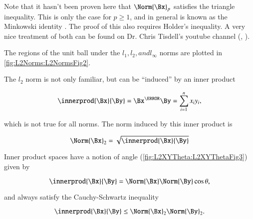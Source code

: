 Note that it hasn't been proven here that \( \Norm{\Bx}_p \) satisfies the triangle inequality.  This is only the case for \( p \ge 1 \), and in general is known as the Minkowski identity \citep{triangleInequalityMathSE}.  The proof of this also requires Holder's inequality.  A very nice treatment of both can be found on Dr. Chris Tisdell's youtube channel (\citep{tisdellMinkowski}, \citep{tisdellHolder}).


The regions of the unit ball under the \( l_1, l_2, and l_\infty \) norms are plotted in \cref{fig:L2Norms:L2NormsFig2}.


The \( l_2 \) norm is not only familiar, but can be ``induced'' by an inner product

\begin{equation}\label{eqn:convex-optimizationLecture2:84}
\innerprod{\Bx}{\By} = \Bx^\T \By = \sum_{i = 1}^n x_i y_i,
\end{equation}

which is not true for all norms.  The norm induced by this inner product is

\begin{dmath}\label{eqn:convex-optimizationLecture2:104}
\Norm{\Bx}_2 = \sqrt{ \innerprod{\Bx}{\By} }
\end{dmath}

Inner product spaces have a notion of angle
(\cref{fig:L2XYTheta:L2XYThetaFig3})
given by

\begin{dmath}\label{eqn:convex-optimizationLecture2:124}
\innerprod{\Bx}{\By} = \Norm{\Bx} \Norm{\By} \cos \theta,
\end{dmath}

and always satisfy the Cauchy-Schwartz inequality

\begin{dmath}\label{eqn:convex-optimizationLecture2:144}
\innerprod{\Bx}{\By} \le \Norm{\Bx}_2 \Norm{\By}_2.
\end{dmath}

